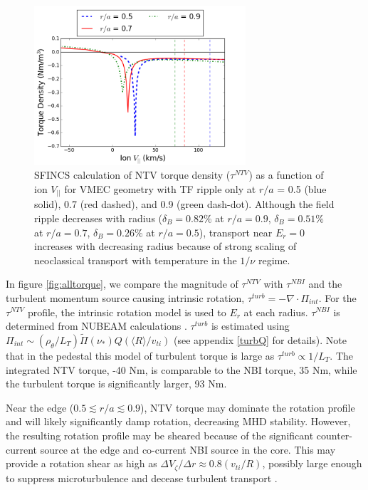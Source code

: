 \documentclass{article}
\numberwithin{figure}{section}
\numberwithin{equation}{section}
\begin{document}
\begin{figure}[h!]
\centering
\includegraphics[width=0.7\textwidth]
{Torque_radiusscaling.png}
\caption{\label{fig:Torque_radiusscaling} SFINCS calculation of NTV torque density ($\tau^{NTV}$) as a function of ion $V_{||}$ for VMEC geometry with TF ripple only at $r/a$ = 0.5 (blue solid), 0.7 (red dashed), and 0.9 (green dash-dot). Although the field ripple decreases with radius ($\delta_B = 0.82\%$ at $r/a = 0.9$, $\delta_B = 0.51\%$ at $r/a = 0.7$, $\delta_B = 0.26\%$ at $r/a = 0.5$), transport near $E_r = 0$ increases with decreasing radius because of strong scaling of neoclassical transport with temperature in the $1/\nu$ regime.}
\end{figure}

In figure \ref{fig:alltorque}, we compare the magnitude of $\tau^{NTV}$ with $\tau^{NBI}$ and the turbulent momentum source causing intrinsic rotation, $\tau^{turb} = -\nabla \cdot \Pi_{int}$. For the $\tau^{NTV}$ profile, the intrinsic rotation model is used to $E_r$ at each radius. $\tau^{NBI}$ is determined from NUBEAM calculations \cite{Poli2014}. $\tau^{turb}$ is estimated using $\Pi_{int} \sim (\rho_{\theta}/L_T) \widetilde{\Pi}(\nu_*) Q (\langle R \rangle/v_{ti})$ (see appendix \ref{turbQ} for details). Note that in the pedestal this model of turbulent torque is large as $\tau^{turb} \propto 1/L_T$. The integrated NTV torque, -40 Nm, is comparable to the NBI torque, 35 Nm, while the turbulent torque is significantly larger, 93 Nm. 

Near the edge ($0.5 \lesssim r/a \lesssim 0.9$), NTV torque may dominate the rotation profile and will likely significantly damp rotation, decreasing MHD stability. However, the resulting rotation profile may be sheared because of the significant counter-current source at the edge and co-current NBI source in the core. This may provide a rotation shear as high as $\Delta V_{\zeta}/ \Delta r \approx 0.8 (v_{ti}/R)$, possibly large enough to suppress microturbulence and decease turbulent transport \cite{Hahm1994}. 
\end{document}
